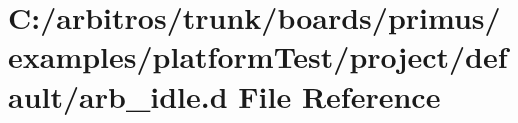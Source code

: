 \hypertarget{boards_2primus_2examples_2platform_test_2project_2default_2arb__idle_8d}{\section{C\-:/arbitros/trunk/boards/primus/examples/platform\-Test/project/default/arb\-\_\-idle.d File Reference}
\label{boards_2primus_2examples_2platform_test_2project_2default_2arb__idle_8d}
}
